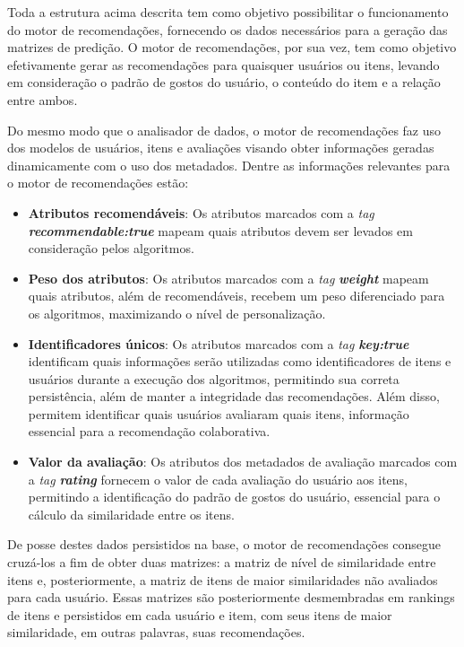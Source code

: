 Toda a estrutura acima descrita tem como objetivo possibilitar o funcionamento do motor de recomendações, fornecendo os dados necessários para a geração das matrizes de predição. O motor de recomendações, por sua vez, tem como objetivo efetivamente gerar as recomendações para quaisquer usuários ou itens, levando em consideração o padrão de gostos do usuário, o conteúdo do item e a relação entre ambos.

Do mesmo modo que o analisador de dados, o motor de recomendações faz uso dos modelos de usuários, itens e avaliações visando obter informações geradas dinamicamente com o uso dos metadados. Dentre as informações relevantes para o motor de recomendações estão:

\begin{itemize}
	\item \textbf{Atributos recomendáveis}: Os atributos marcados com a \textit{tag} \textbf{\textit{recommendable:true}} mapeam quais atributos devem ser levados em consideração pelos algoritmos.

	\item \textbf{Peso dos atributos}: Os atributos marcados com a \textit{tag} \textbf{\textit{weight}} mapeam quais atributos, além de recomendáveis, recebem um peso diferenciado para os algoritmos, maximizando o nível de personalização.

	\item \textbf{Identificadores únicos}: Os atributos marcados com a \textit{tag} \textbf{\textit{key:true}} identificam quais informações serão utilizadas como identificadores de itens e usuários durante a execução dos algoritmos, permitindo sua correta persistência, além de manter a integridade das recomendações. Além disso, permitem identificar quais usuários avaliaram quais itens, informação essencial para a recomendação colaborativa.

	\item \textbf{Valor da avaliação}: Os atributos dos metadados de avaliação marcados com a \textit{tag} \textbf{\textit{rating}} fornecem o valor de cada avaliação do usuário aos itens, permitindo a identificação do padrão de gostos do usuário, essencial para o cálculo da similaridade entre os itens.
\end{itemize}

De posse destes dados persistidos na base, o motor de recomendações consegue cruzá-los a fim de obter duas matrizes: a matriz de nível de similaridade entre itens e, posteriormente, a matriz de itens de maior similaridades não avaliados para cada usuário. Essas matrizes são posteriormente desmembradas em rankings de itens e persistidos em cada usuário e item, com seus itens de maior similaridade, em outras palavras, suas recomendações.

